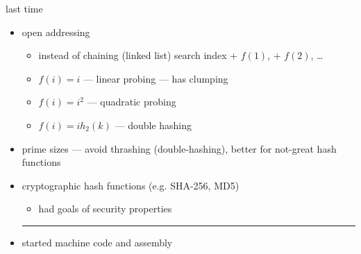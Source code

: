 \begin{frame}{last time}
    \begin{itemize}
    \item open addressing
        \begin{itemize}
            \item instead of chaining (linked list) search index + $f(1)$, + $f(2)$, \ldots
            \item $f(i) = i$ --- linear probing --- has clumping
            \item $f(i) = i^2$ --- quadratic probing
            \item $f(i) = i h_2(k)$ --- double hashing
        \end{itemize} 
    \item prime sizes --- avoid thrashing (double-hashing), better for not-great hash functions
    \item cryptographic hash functions (e.g. SHA-256, MD5)
        \begin{itemize}
        \item had goals of security properties
        \end{itemize}
    \hrule
    \item started machine code and assembly
    \end{itemize}
\end{frame}
